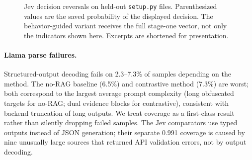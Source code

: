 \begin{figure}[!ht]
{\begin{minipage}[t]{0.30\textwidth}
    \end{minipage}}
    \hfill
    \caption{Jev decision reversals on held-out \texttt{setup.py} files.
    Parenthesized values are the saved probability of the displayed decision.
    The behavior-guided variant receives the full stage-one vector, not only
    the indicators shown here. Excerpts are shortened for presentation.}
    \label{fig:jev-error-examples}
\end{figure}

\paragraph{Llama parse failures.} Structured-output decoding fails on 2.3--7.3\%
of samples depending on the method. The no-RAG baseline (6.5\%) and
contrastive method (7.3\%) are worst; both correspond to the largest average
prompt complexity (long obfuscated targets for no-RAG; dual evidence blocks
for contrastive), consistent with backend truncation of long outputs. We
treat coverage as a first-class result rather than silently dropping failed
samples. The Jev comparators use typed outputs instead of JSON generation;
their separate 0.991 coverage is caused by nine unusually large sources that
returned API validation errors, not by output decoding.
\endinput
